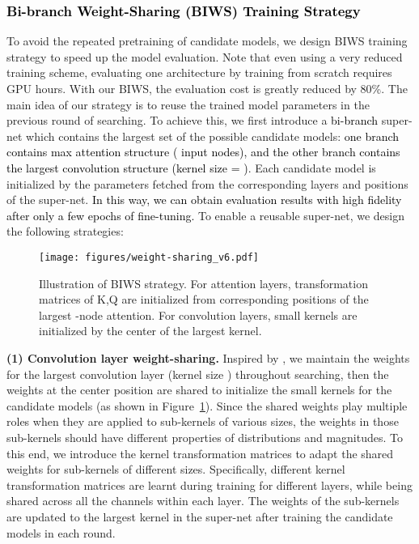 \documentclass[letterpaper]{article} \usepackage{aaai22}  \usepackage{times}  \usepackage{helvet}  \usepackage{courier}  \usepackage[hyphens]{url}  \usepackage{graphicx} \urlstyle{rm} \def\UrlFont{\rm}  \usepackage{natbib}  \usepackage{caption} \DeclareCaptionStyle{ruled}{labelfont=normalfont,labelsep=colon,strut=off} \frenchspacing  \setlength{\pdfpagewidth}{8.5in}  \setlength{\pdfpageheight}{11in}  \usepackage{algorithm}
\newcommand{\prj}[1]{\textcolor{black}{#1}} \newcommand{\prjj}[1]{\textcolor{black}{#1}} \newcommand{\jhh}[1]{\textcolor{black}{#1}} \newcommand{\jh}[1]{\textcolor{black}{#1}} \newcommand{\sh}[1]{\textcolor{black}{#1}} \usepackage{multirow}
\begin{document}
\subsubsection{
\prj{Bi-branch Weight-Sharing (BIWS) Training Strategy}
}

To avoid the repeated pretraining of candidate models, we
design BIWS training strategy to speed up the model evaluation. Note that
even using a very reduced training scheme, evaluating one architecture by
training from scratch requires  GPU hours. With our BIWS, the evaluation cost is greatly reduced by 80\%. The main idea
of our strategy is to reuse the trained model parameters
in the previous round of searching. To achieve this, we first introduce a \jh{bi-branch}
super-net which contains the largest set of the possible candidate
models: \jh{one branch contains max attention structure ( input nodes), and the other branch contains the largest convolution structure
(kernel size = )}. Each candidate model is initialized by the parameters fetched from the corresponding layers and positions of the super-net. \prj{In this way, we can obtain evaluation results with high fidelity after only a few epochs of fine-tuning.}
To enable a reusable super-net, we design the following strategies: 

\begin{figure}[h]
\centering
 	\vspace{-3mm}
	\texttt{[image: figures/weight-sharing\_v6.pdf]}
    \vspace{-5mm}
	\caption{Illustration of BIWS strategy. For attention layers, transformation matrices of K,Q are initialized from corresponding positions of the largest -node attention. For convolution layers, small kernels are initialized by the center of the largest kernel.}
	\label{fig:weight-sharing}
	\vspace{-4mm}
\end{figure}

\textbf{(1) Convolution layer weight-sharing.} Inspired by \citep{cai2019once},  we maintain the weights for the largest convolution layer (kernel size ) throughout searching, then the weights at the center position are shared to initialize the small kernels for the candidate models (as shown in Figure~\ref{fig:weight-sharing}). Since the shared weights play multiple roles when they are applied to sub-kernels of various sizes, the weights in those sub-kernels should have different properties of distributions and magnitudes. To this end, we introduce the kernel transformation matrices to adapt the shared weights for sub-kernels of different sizes. 
{Specifically, different kernel transformation matrices are learnt during training for different layers, while being shared across all the channels within each layer.} 
The weights of the sub-kernels
are updated to the largest kernel in the super-net after training the candidate models in each round.
\end{document}
